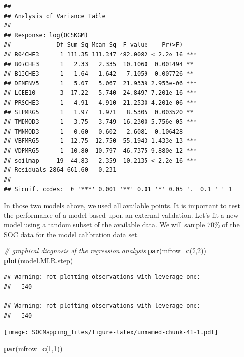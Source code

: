 \documentclass[10pt,b5paper,]{book}
\newenvironment{Shaded}{\begin{snugshade}}{\end{snugshade}}
\newcommand{\CommentTok}[1]{\textcolor[rgb]{0.56,0.35,0.01}{\textit{#1}}}
\newcommand{\DataTypeTok}[1]{\textcolor[rgb]{0.13,0.29,0.53}{#1}}
\newcommand{\DecValTok}[1]{\textcolor[rgb]{0.00,0.00,0.81}{#1}}
\newcommand{\KeywordTok}[1]{\textcolor[rgb]{0.13,0.29,0.53}{\textbf{#1}}}
\newcommand{\NormalTok}[1]{#1}
\theoremstyle{definition}
\theoremstyle{definition}
\theoremstyle{definition}
\theoremstyle{remark}
\begin{document}
\begin{verbatim}
## 
## Analysis of Variance Table
## 
## Response: log(OCSKGM)
##             Df Sum Sq Mean Sq  F value    Pr(>F)    
## B04CHE3      1 111.35 111.347 482.0082 < 2.2e-16 ***
## B07CHE3      1   2.33   2.335  10.1060  0.001494 ** 
## B13CHE3      1   1.64   1.642   7.1059  0.007726 ** 
## DEMENV5      1   5.07   5.067  21.9339 2.953e-06 ***
## LCEE10       3  17.22   5.740  24.8497 7.201e-16 ***
## PRSCHE3      1   4.91   4.910  21.2530 4.201e-06 ***
## SLPMRG5      1   1.97   1.971   8.5305  0.003520 ** 
## TMDMOD3      1   3.75   3.749  16.2300 5.756e-05 ***
## TMNMOD3      1   0.60   0.602   2.6081  0.106428    
## VBFMRG5      1  12.75  12.750  55.1943 1.433e-13 ***
## VDPMRG5      1  10.80  10.797  46.7375 9.880e-12 ***
## soilmap     19  44.83   2.359  10.2135 < 2.2e-16 ***
## Residuals 2864 661.60   0.231                       
## ---
## Signif. codes:  0 '***' 0.001 '**' 0.01 '*' 0.05 '.' 0.1 ' ' 1
\end{verbatim}

In those two models above, we used all available points. It is important
to test the performance of a model based upon an external validation.
Let's fit a new model using a random subset of the available data. We
will sample \(70\%\) of the SOC data for the model calibration data set.

\begin{Shaded}
\begin{Highlighting}[]
\CommentTok{# graphical diagnosis of the regression analysis}
\KeywordTok{par}\NormalTok{(}\DataTypeTok{mfrow=}\KeywordTok{c}\NormalTok{(}\DecValTok{2}\NormalTok{,}\DecValTok{2}\NormalTok{))}
\KeywordTok{plot}\NormalTok{(model.MLR.step)}
\end{Highlighting}
\end{Shaded}

\begin{verbatim}
## Warning: not plotting observations with leverage one:
##   340

## Warning: not plotting observations with leverage one:
##   340
\end{verbatim}

\texttt{[image: SOCMapping\_files/figure-latex/unnamed-chunk-41-1.pdf]}

\begin{Shaded}
\begin{Highlighting}[]
\KeywordTok{par}\NormalTok{(}\DataTypeTok{mfrow=}\KeywordTok{c}\NormalTok{(}\DecValTok{1}\NormalTok{,}\DecValTok{1}\NormalTok{))}
\end{Highlighting}
\end{Shaded}
\end{document}
